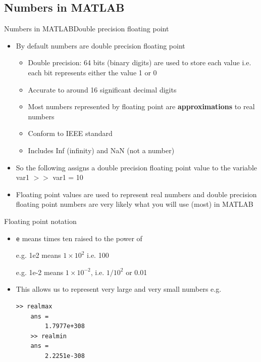 \documentclass{beamer}
\begin{document}
\subsection{Numbers in MATLAB}
\begin{frame}{Numbers in MATLAB}{Double precision floating point}
	\begin{itemize}
		\item By default numbers are double precision floating point
		\begin{itemize}
			\item Double precision: 64 bits (binary digits) are used to store each value i.e. each bit represents either the value 1 or 0
			\item Accurate to around 16 significant decimal digits
			\item Most numbers represented by floating point are \textbf{approximations} to real numbers
			\item Conform to IEEE standard
			\item Includes Inf (infinity) and NaN (not a number)
		\end{itemize}
		\item So the following assigns a double precision floating point value to the variable var1
		$>>$ var1 = 10
		\item Floating point values are used to represent real numbers and double precision floating point numbers are very likely what you will use (most) in MATLAB
	\end{itemize}
\end{frame}

\begin{frame}[fragile]{Floating point notation}
	\begin{itemize}
		\item \texttt{e} means times ten raised to the power of 
		
		e.g. 1e2 means $1 \times 10^{2}$ i.e. 100
		
		e.g. 1e-2 means $1 \times 10^{-2}$, i.e. $1/10^{2}$ or 0.01
		\item This allows us to represent very large and very small numbers e.g.
	\begin{lstlisting}[style=Matlab-editor]
	>> realmax
	ans = 
		1.7977e+308
	>> realmin
	ans = 
		2.2251e-308	
	\end{lstlisting}
	\end{itemize} 
\end{frame}
\end{document}
